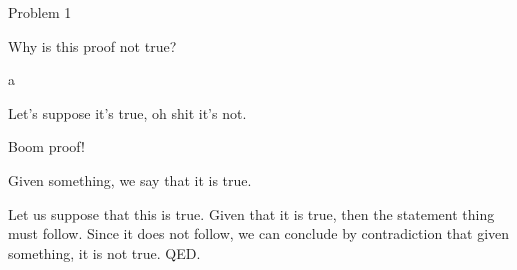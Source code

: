 \documentclass{article}
\begin{document}
    \setlength{\parindent}{0pt}
    \noindent

    

    \begin{section}{Problem 1}

        \begin{problem}{1}
            Why is this proof not true?
        \end{problem}

        \begin{solution}{a}
            \begin{draft}
                Let's suppose it's true, oh shit it's not.

                Boom proof!
            \end{draft}

            \begin{proposition}
                Given something, we say that it is true.
            \end{proposition}

            \begin{dproof}
                Let us suppose that this is true. Given that it is true, then the statement thing must follow. Since it does not follow, we can conclude by contradiction that given something, it is not true. QED.
            \end{dproof}


        \end{solution}
    \end{section}

    
\end{document}
